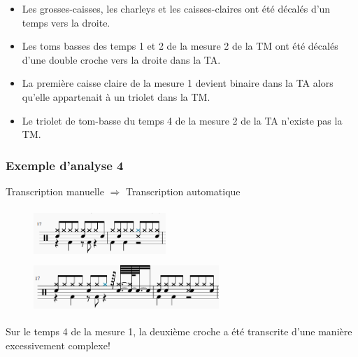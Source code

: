 \begin{itemize}
	\item Les grosses-caisses, les charleys et les caisses-claires ont été
        décalés d’un temps vers la droite.
	\item Les toms basses des temps 1 et 2 de la mesure 2 de la TM ont été
        décalés d’une double croche vers la droite dans la TA.
	\item La première caisse claire de la mesure 1 devient binaire dans la TA
        alors qu’elle appartenait à un triolet dans la TM.
	\item Le triolet de tom-basse du temps 4 de la mesure 2 de la TA n’existe
        pas la TM.\\
\end{itemize}

\subsubsection{Exemple d’analyse 4}
\tab \tab Transcription manuelle $\Rightarrow$ Transcription automatique
\begin{figure}[h]
\centering
\includegraphics[height=19mm, width=50mm]{
z_images/4_experimentations/1_analyses/1_drummer1_session1/3_manuelle.png}
\ \ \ \ 
\includegraphics[height=19mm, width=70mm]{
z_images/4_experimentations/1_analyses/1_drummer1_session1/2_musescore.png}
\end{figure}

Sur le temps 4 de la mesure 1, la deuxième croche a été transcrite d’une
manière excessivement complexe!

